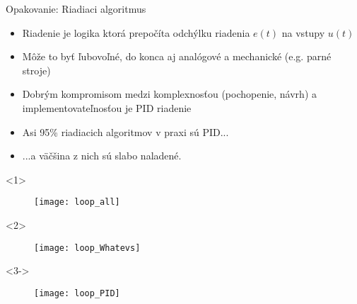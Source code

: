 \documentclass{beamer}
\begin{document}
\begin{frame}[t]{Opakovanie: Riadiaci algoritmus}
  \begin{itemize}
    \item<1-> Riadenie je logika ktorá prepočíta odchýlku riadenia $e(t)$ na vstupy $u(t)$
    \item<2-> Môže to byť ľubovoľné, do konca aj analógové a mechanické (e.g. parné stroje)
    \item<3-> Dobrým kompromisom medzi komplexnosťou (pochopenie, návrh) a implementovateľnosťou je PID riadenie
    \item<4-> Asi 95\% riadiacich algoritmov v praxi sú PID...
    \item<5-> ...a väčšina z nich sú slabo naladené.
  \end{itemize}

\begin{onlyenv}<1>
\begin{figure}
\centering
  \texttt{[image: loop\_all]}\\
\end{figure}
\end{onlyenv}

\begin{onlyenv}<2>
\begin{figure}
\centering
  \texttt{[image: loop\_Whatevs]}\\
\end{figure}
\end{onlyenv}



\begin{onlyenv}<3->
\begin{figure}
\centering
  \texttt{[image: loop\_PID]}\\
\end{figure}
\end{onlyenv}
\end{frame}
\end{document}
